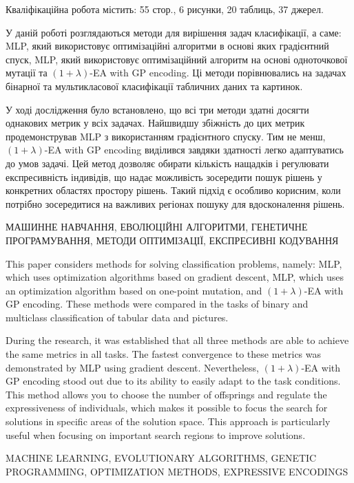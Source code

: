 
\abstractUkr

Кваліфікаційна робота містить: 55 стор., 6 рисунки, 20 таблиць, 37 джерел.

У даній роботі розглядаються методи для вирішення задач класифікації, а саме: MLP, який використовує оптимізаційні алгоритми в основі яких градієнтний спуск, MLP, який використовує оптимізаційний алгоритм на основі одноточкової мутації та $(1+\lambda)$-EA with GP encoding. Ці методи порівнювались на задачах бінарної та мультикласової класифікації табличних даних та картинок.

У ході дослідження було встановлено, що всі три методи здатні досягти однакових метрик у всіх задачах. Найшвидшу збіжність до цих метрик продемонстрував MLP з використанням градієнтного спуску. Тим не менш, $(1+\lambda)$-EA with GP encoding виділився завдяки здатності легко адаптуватись до умов задачі. Цей метод дозволяє обирати кількість нащадків і регулювати експресивність індивідів, що надає можливість зосередити пошук рішень у конкретних областях простору рішень. Такий підхід є особливо корисним, коли потрібно зосередитися на важливих регіонах пошуку для вдосконалення рішень.


\MakeUppercase{МАШИННЕ НАВЧАННЯ, ЕВОЛЮЦІЙНІ АЛГОРИТМИ, ГЕНЕТИЧНЕ ПРОГРАМУВАННЯ, МЕТОДИ ОПТИМІЗАЦІЇ, ЕКСПРЕСИВНІ КОДУВАННЯ}


%

\abstractEng

This paper considers methods for solving classification problems, namely: MLP, which uses optimization algorithms based on gradient descent, MLP, which uses an optimization algorithm based on one-point mutation, and $(1+\lambda)$-EA with GP encoding. These methods were compared in the tasks of binary and multiclass classification of tabular data and pictures.

During the research, it was established that all three methods are able to achieve the same metrics in all tasks. The fastest convergence to these metrics was demonstrated by MLP using gradient descent. Nevertheless, $(1+\lambda)$-EA with GP encoding stood out due to its ability to easily adapt to the task conditions. This method allows you to choose the number of offsprings and regulate the expressiveness of individuals, which makes it possible to focus the search for solutions in specific areas of the solution space. This approach is particularly useful when focusing on important search regions to improve solutions.

\MakeUppercase{MACHINE LEARNING, EVOLUTIONARY ALGORITHMS, GENETIC PROGRAMMING, OPTIMIZATION METHODS, EXPRESSIVE ENCODINGS}

\clearpage